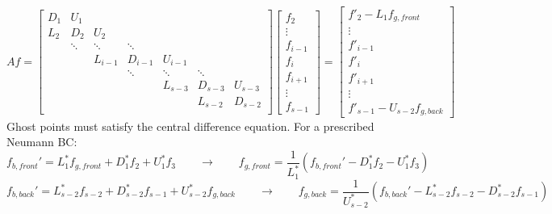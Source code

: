 \documentclass[11pt]{article}
\begin{document}
\[ Af = \left[
\begin{array}{ccccccccc}
D_{1} & U_{1}    &           &           &           &           &         \\
L_{2} & D_{2}    & U_{2}     &           &           &           &         \\
      & \ddots   & \ddots    & \ddots    &           &           &         \\
      &          & L_{i-1}   & D_{i-1}   & U_{i-1}   &           &         \\
      &          &           & \ddots    & \ddots    & \ddots    &         \\
      &          &           &           & L_{s-3}   & D_{s-3}   & U_{s-3} \\
      &          &           &           &           & L_{s-2}   & D_{s-2} \\
\end{array} \right] 
\left[ \begin{array}{c}
f_{2} \\ \vdots \\ f_{i-1} \\ f_{i} \\ f_{i+1} \\ \vdots \\ f_{s-1}
\end{array} \right]
=
\left[ \begin{array}{c}
f'_{2} - L_1 f_{g,front} \\ \vdots \\ 
f'_{i-1} \\ f'_{i} \\ f'_{i+1} \\ \vdots \\ f'_{s-1} - U_{s-2} f_{g,back}
\end{array} \right]
\]
\noindent
Ghost points must satisfy the central difference equation. For a prescribed Neumann BC:
\begin{equation}
      f_{b,front}' = L_1^* f_{g,front} + D_1^* f_2 + U_1^* f_3
      \qquad \rightarrow \qquad
      f_{g,front} = \frac{1}{L_1^*} (f_{b,front}' - D_1^* f_2 - U_1^* f_3)
\end{equation}
\begin{equation}
      f_{b,back}' = L_{s-2}^* f_{s-2} + D_{s-2}^* f_{s-1} + U_{s-2}^* f_{g,back}
      \qquad \rightarrow \qquad
      f_{g,back} = \frac{1}{U_{s-2}^*} (f_{b,back}' - L_{s-2}^* f_{s-2} - D_{s-2}^* f_{s-1})
\end{equation}
\end{document}
